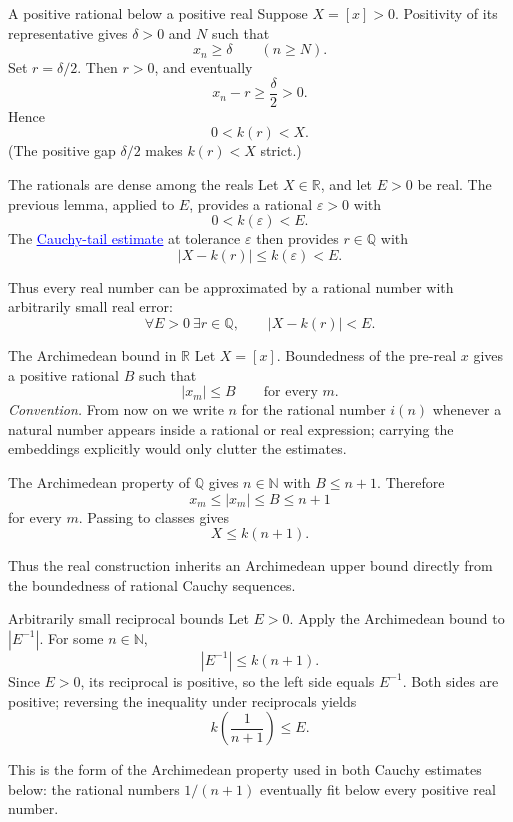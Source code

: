 \documentclass[aspectratio=169,11pt]{beamer}
\newcommand{\N}{\mathbb N}
\newcommand{\Q}{\mathbb Q}
\newcommand{\R}{\mathbb R}
\begin{document}
\begin{frame}{A positive rational below a positive real}
  Suppose \(X=[x]>0\).  Positivity of its representative gives
  \(\delta>0\) and \(N\) such that
  \[
    x_n\ge\delta
    \qquad(n\ge N).
  \]
  Set \(r=\delta/2\).  Then \(r>0\), and eventually
  \[
    x_n-r\ge\frac\delta2>0.
  \]
  Hence
  \[
    0<k(r)<X.
  \]
  (The positive gap \(\delta/2\) makes \(k(r)<X\) strict.)
\end{frame}

\begin{frame}{The rationals are dense among the reals}
  Let \(X\in\R\), and let \(E>0\) be real.  The previous lemma, applied to
  \(E\), provides a rational \(\varepsilon>0\) with
  \[
    0<k(\varepsilon)<E.
  \]
  The
  \hyperlink{cauchy-tail-distance}{\textcolor{blue}{\underline{Cauchy-tail estimate}}}
  at tolerance \(\varepsilon\) then provides \(r\in\Q\) with
  \[
    |X-k(r)|\le k(\varepsilon)<E.
  \]

  Thus every real number can be approximated by a rational number with
  arbitrarily small real error:
  \[
    \boxed{\forall E>0\ \exists r\in\Q,\qquad |X-k(r)|<E.}
  \]
\end{frame}

\begin{frame}{The Archimedean bound in \(\R\)}
  Let \(X=[x]\).  Boundedness of the pre-real \(x\) gives a positive rational
  \(B\) such that
  \[
    |x_m|\le B\qquad\text{for every }m.
  \]
  \emph{Convention.}  From now on we write \(n\) for the rational number
  \(i(n)\) whenever a natural number appears inside a rational or real
  expression; carrying the embeddings explicitly would only clutter the
  estimates.

  The Archimedean property of \(\Q\) gives \(n\in\N\) with \(B\le n+1\).
  Therefore
  \[
    x_m\le|x_m|\le B\le n+1
  \]
  for every \(m\).  Passing to classes gives
  \[
    \boxed{X\le k(n+1).}
  \]

  Thus the real construction inherits an Archimedean upper bound directly
  from the boundedness of rational Cauchy sequences.
\end{frame}

\begin{frame}{Arbitrarily small reciprocal bounds}
  Let \(E>0\).  Apply the Archimedean bound to \(|E^{-1}|\).  For some
  \(n\in\N\),
  \[
    |E^{-1}|\le k(n+1).
  \]
  Since \(E>0\), its reciprocal is positive, so the left side equals
  \(E^{-1}\).  Both sides are positive; reversing the inequality under
  reciprocals yields
  \[
    \boxed{k\!\left(\frac1{n+1}\right)\le E.}
  \]

  This is the form of the Archimedean property used in both Cauchy estimates
  below: the rational numbers \(1/(n+1)\) eventually fit below every positive
  real number.
\end{frame}
\end{document}
